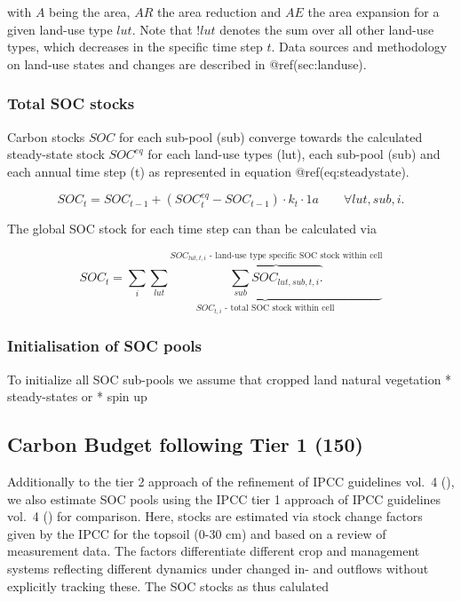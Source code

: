 \documentclass[gc, manuscript]{copernicus}
\begin{document}
with \(A\) being the area, \(AR\) the area reduction and \(AE\) the area
expansion for a given land-use type \(lut\). Note that \(!lut\) denotes
the sum over all other land-use types, which decreases in the specific
time step \(t\). Data sources and methodology on land-use states and
changes are described in @ref(sec:landuse).

\subsubsection{Total SOC stocks}

Carbon stocks \(SOC\) for each sub-pool (sub) converge towards the
calculated steady-state stock \(SOC^{eq}\) for each land-use types
(lut), each sub-pool (sub) and each annual time step (t) as represented
in equation @ref(eq:steadystate).

\begin{equation}
SOC_{t} = SOC_{t-1} + (SOC^{eq}_{t} - SOC_{t-1}) \cdot k_{t} \cdot 1\unit{a} \qquad \forall lut, sub, i.
\label{eq:steadystate}
\end{equation}

The global SOC stock for each time step can than be calculated via

\begin{equation}
SOC_{t} = \sum_{i} \underbrace{\sum_{lut} \overbrace{\sum_{sub} SOC_{lut, sub, t, i}.}^{\text{$SOC_{lut, t, i}$ - land-use type specific SOC stock within cell}}}_{\text{$SOC_{t, i}$ - total SOC stock within cell}}
\label{eq:totalstock}
\end{equation}

\subsubsection{Initialisation of SOC pools}

To initialize all SOC sub-pools we assume that cropped land natural
vegetation * steady-states or * spin up

\newpage

\hypertarget{sec:tier1}{%
\subsection{Carbon Budget following Tier 1 (150)}\label{sec:tier1}}

Additionally to the tier 2 approach of the refinement of IPCC guidelines
vol.~4 (\citet{ipcc_2019_2019}), we also estimate SOC pools using the
IPCC tier 1 approach of IPCC guidelines vol.~4 (\citet{ipcc_2006_2006})
for comparison. Here, stocks are estimated via stock change factors
given by the IPCC for the topsoil (0-30 cm) and based on a review of
measurement data. The factors differentiate different crop and
management systems reflecting different dynamics under changed in- and
outflows without explicitly tracking these. The SOC stocks as thus
calulated
\end{document}
